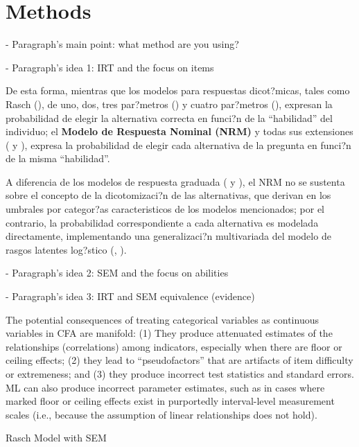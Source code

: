 \section{Methods}

- Paragraph's main point: what method are you using?


- Paragraph's idea 1: IRT and the focus on items

De esta forma, mientras que los modelos para respuestas dicot?micas, tales como Rasch (\citealp{Rasch1980}), de uno, dos, tres par?metros (\citealp{Lord_Nov2008}) y cuatro par?metros (\citealp{McDonald1967}), expresan la probabilidad de elegir la alternativa correcta en funci?n de la ``habilidad'' del individuo; el \textbf{Modelo de Respuesta Nominal (NRM)} y todas sus extensiones (\citealt{Bock1972}  y \citealt[cap?tulo 2]{Linden1997}), expresa la probabilidad de elegir cada alternativa de la pregunta en funci?n de la misma ``habilidad''.

A diferencia de los modelos de respuesta graduada (\citealt{Samejima1969, Samejima1972} y \citealt[cap?tulo 5]{Ham_Swam1991}), el NRM no se sustenta sobre el concepto de la dicotomizaci?n de las alternativas, que derivan en los umbrales por categor?as caracteristicos de los modelos mencionados; por el contrario, la probabilidad correspondiente a cada alternativa es modelada directamente, implementando una generalizaci?n multivariada del modelo de rasgos latentes log?stico (\citealt{Bock1972}, \citealt{Ostini2006}).



- Paragraph's idea 2: SEM and the focus on abilities




- Paragraph's idea 3: IRT and SEM equivalence (evidence)

\citep{Brown_2015}
The potential consequences of treating categorical variables as continuous variables in CFA are manifold: (1) They produce attenuated estimates of the relationships (correlations) among indicators, especially when there are floor or ceiling effects; (2) they lead to “pseudofactors” that are artifacts of item difficulty or extremeness; and (3) they produce incorrect test statistics and standard errors. ML can also produce  incorrect parameter estimates, such as in cases where marked floor or ceiling effects exist in purportedly interval-level measurement scales (i.e., because the assumption of linear relationships does not hold).


Rasch Model with SEM

